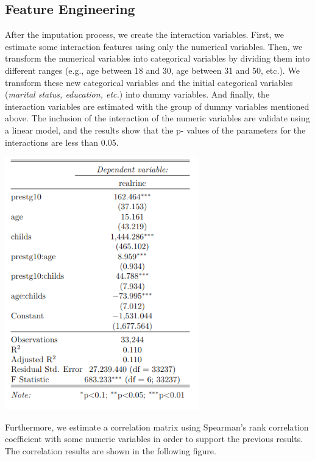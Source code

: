\documentclass[11pt,a4paper]{article}
\let\origfigure\figure
\let\endorigfigure\endfigure
\renewenvironment{figure}[1][2] {
    \expandafter\origfigure\expandafter[H]
} {
    \endorigfigure
}
\begin{document}
\hypertarget{feature-engineering}{%
\subsection{Feature Engineering}\label{feature-engineering}}

After the imputation process, we create the interaction variables.
First, we estimate some interaction features using only the numerical
variables. Then, we transform the numerical variables into categorical
variables by dividing them into different ranges (e.g., age between 18
and 30, age between 31 and 50, etc.). We transform these new categorical
variables and the initial categorical variables (\emph{marital status,
education, etc.}) into dummy variables. And finally, the interaction
variables are estimated with the group of dummy variables mentioned
above. The inclusion of the interaction of the numeric variables are
validate using a linear model, and the results show that the p- values
of the parameters for the interactions are less than 0.05.

\begin{figure}
\centering
\includegraphics[width=3.30208in,height=\textheight]{includes/reg_table.png}
\caption{Linear Model: Inclusion of Interaction Variables}
\end{figure}

Furthermore, we estimate a correlation matrix using Spearman's rank
correlation coefficient with some numeric variables in order to support
the previous results. The correlation results are shown in the following
figure.
\end{document}
